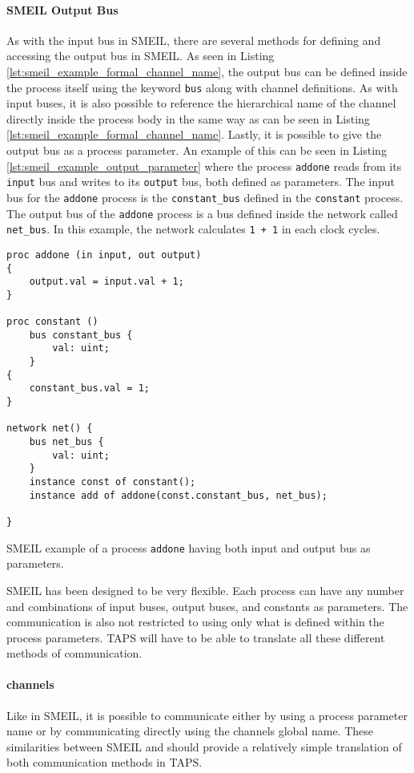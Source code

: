 \paragraph{SMEIL Output Bus}
As with the input bus in SMEIL, there are several methods for defining and accessing the output bus in SMEIL.
As seen in Listing \ref{lst:smeil_example_formal_channel_name}, the output bus can be defined inside the process itself using the keyword \texttt{bus} along with channel definitions. As with input buses, it is also possible to reference the hierarchical name of the channel directly inside the process body in the same way as can be seen in Listing \ref{lst:smeil_example_formal_channel_name}. Lastly, it is possible to give the output bus as a process parameter.
An example of this can be seen in Listing \ref{lst:smeil_example_output_parameter} where the process \texttt{addone} reads from its \texttt{input} bus and writes to its \texttt{output} bus, both defined as parameters. The input bus for the \texttt{addone} process is the \texttt{constant\_bus} defined in the \texttt{constant} process. The output bus of the \texttt{addone} process is a bus defined inside the network called \texttt{net\_bus}. In this example, the network calculates \texttt{1 + 1} in each clock cycles.
\begin{listing}
\begin{verbatim}
proc addone (in input, out output)
{
    output.val = input.val + 1;
}

proc constant ()
    bus constant_bus {
        val: uint;
    }
{
    constant_bus.val = 1;
}

network net() {
    bus net_bus {
        val: uint;
    }
    instance const of constant();
    instance add of addone(const.constant_bus, net_bus);

}
\end{verbatim}
\caption{SMEIL example of a process \texttt{addone} having both input and output bus as parameters.}
\label{lst:smeil_example_output_parameter}
\end{listing}

SMEIL has been designed to be very flexible. Each process can have any number and combinations of input buses, output buses, and constants as parameters. The communication is also not restricted to using only what is defined within the process parameters. TAPS will have to be able to translate all these different methods of communication.

\paragraph{\cspm{} channels}
Like in SMEIL, it is possible to communicate either by using a process parameter name or by communicating directly using the channels global name. These similarities between SMEIL and \cspm{} should provide a relatively simple translation of both communication methods in TAPS.\\

